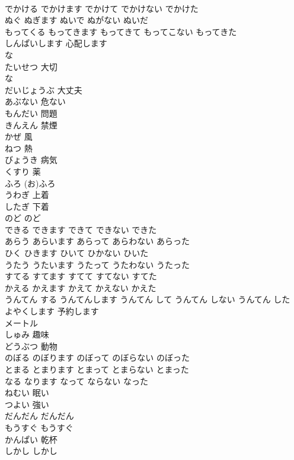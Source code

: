 \documentclass[8pt]{extreport}
\begin{document}
\begin{CJK}{UTF8}{min}
\\	でかける	でかけます	でかけて	でかけない	でかけた	
\\	ぬぐ	ぬぎます	ぬいで	ぬがない	ぬいだ	
\\	もってくる	もってきます	もってきて	もってこない	もってきた	
\\	しんぱいします	心配します
\\	な 
\\	たいせつ	大切
\\	な 
\\	だいじょうぶ	大丈夫
\\	あぶない	危ない
\\	もんだい	問題
\\	きんえん	禁煙
\\	かぜ	風
\\	ねつ	熱
\\	びょうき	病気
\\	くすり	薬
\\	ふろ	(お)ふろ
\\	うわぎ	上着
\\	したぎ	下着
\\	のど	のど
\\	できる	できます	できて	できない	できた	
\\	あらう	あらいます	あらって	あらわない	あらった	
\\	ひく	ひきます	ひいて	ひかない	ひいた	
\\	うたう	うたいます	うたって	うたわない	うたった	
\\	すてる	すてます	すてて	すてない	すてた	
\\	かえる	かえます	かえて	かえない	かえた	
\\	うんてん する	うんてんします	うんてん して	うんてん しない	うんてん した	
\\	よやくします	予約します
\\	メートル	
\\	しゅみ	趣味
\\	どうぶつ	動物
\\	のぼる	のぼります	のぼって	のぼらない	のぼった	
\\	とまる	とまります	とまって	とまらない	とまった	
\\	なる	なります	なって	ならない	なった	
\\	ねむい	眠い
\\	つよい	強い
\\	だんだん	だんだん
\\	もうすぐ	もうすぐ
\\	かんぱい	乾杯
\\	しかし	しかし

\end{CJK}
\end{document}
